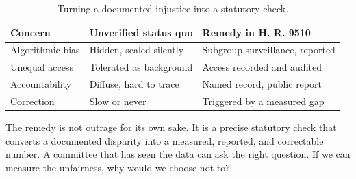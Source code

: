 \begin{table}[H]
\footnotesize
\begin{tabularx}{\textwidth}{@{}L{4.2cm} Y Y@{}}
\toprule
\textbf{Concern} & \textbf{Unverified status quo} & \textbf{Remedy in H. R. 9510}\\
\midrule
Algorithmic bias & Hidden, scaled silently & Subgroup surveillance, reported\\
Unequal access & Tolerated as background & Access recorded and audited\\
Accountability & Diffuse, hard to trace & Named record, public report\\
Correction & Slow or never & Triggered by a measured gap\\
\bottomrule
\end{tabularx}
\caption{Turning a documented injustice into a statutory check.}
\label{tab:outrage}
\end{table}

The remedy is not outrage for its own sake. It is a precise statutory check that
converts a documented disparity into a measured, reported, and correctable number.
A committee that has seen the data can ask the right question. If we can measure
the unfairness, why would we choose not to?
